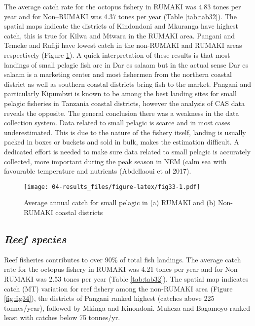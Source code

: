 \documentclass[
  12pt,
  a4paper,
  oneside]{book}
\begin{document}
The average catch rate for the octopus fishery in RUMAKI was 4.83 tones per year and for Non--RUMAKI was 4.37 tones per year (Table \ref{tab:tab32}). The spatial maps indicate the districts of Kindondoni and Mkuranga have highest catch, this is true for Kilwa and Mtwara in the RUMAKI area. Pangani and Temeke and Rufiji have lowest catch in the non-RUMAKI and RUMAKI areas respectively (Figure \ref{fig:fig33}). A quick interpretation of these results is that most landings of small pelagic fish are in Dar es salaam but in the actual sense Dar es salaam is a marketing center and most fishermen from the northern coastal district as well as southern coastal districts bring fish to the market. Pangani and particularly Kipumbwi is known to be among the best landing sites for small pelagic fisheries in Tanzania coastal districts, however the analysis of CAS data reveals the opposite. The general conclusion there was a weakness in the data collection system. Data related to small pelagic is scarce and in most cases underestimated. This is due to the nature of the fishery itself, landing is usually packed in boxes or buckets and sold in bulk, makes the estimation difficult. A dedicated effort is needed to make sure data related to small pelagic is accurately collected, more important during the peak season in NEM (calm sea with favourable temperature and nutrients (Abdellaoui et al 2017).

\begin{figure}
\centering
\texttt{[image: 04-results\_files/figure-latex/fig33-1.pdf]}
\caption{\label{fig:fig33}Average annual catch for small pelagic in (a) RUMAKI and (b) Non-RUMAKI coastal districts}
\end{figure}

\hypertarget{reef-species}{%
\subsection{\texorpdfstring{\emph{Reef species}}{Reef species}}\label{reef-species}}

Reef fisheries contributes to over 90\% of total fish landings. The average catch rate for the octopus fishery in RUMAKI was 4.21 tones per year and for Non--RUMAKI was 2.53 tones per year (Table \ref{tab:tab32}). The spatial map indicates catch (MT) variation for reef fishery among the non-RUMAKI area (Figure \ref{fig:fig34}), the districts of Pangani ranked highest (catches above 225 tonnes/year), followed by Mkinga and Kinondoni. Muheza and Bagamoyo ranked least with catches below 75 tonnes/yr.
\end{document}
